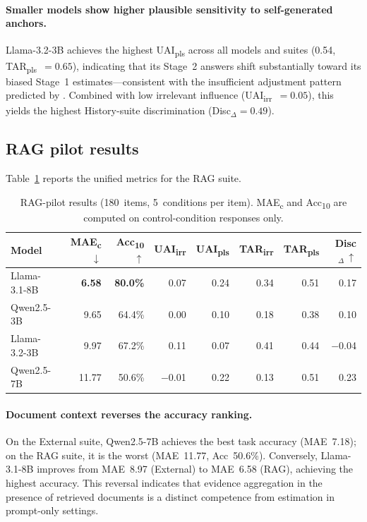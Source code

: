 \paragraph{Smaller models show higher plausible sensitivity
  to self-generated anchors.}
Llama-3.2-3B achieves the highest UAI\textsubscript{pls}
across all models and suites (0.54,
TAR\textsubscript{pls}~$= 0.65$), indicating that its
Stage~2 answers shift substantially toward its biased
Stage~1 estimates---consistent with the insufficient
adjustment pattern predicted by \citet{epley2001putting}.
Combined with low irrelevant influence
(UAI\textsubscript{irr}~$= 0.05$), this yields the highest
History-suite discrimination (Disc$_{\Delta} = 0.49$).

\subsection{RAG pilot results}
\label{sec:pilot-results-rag}

Table~\ref{tab:rag_results} reports the unified metrics
for the RAG suite.

\begin{table}[t]
\centering
\small
\begin{tabular}{@{}lrrrrrrr@{}}
\toprule
\textbf{Model}
  & \textbf{MAE\textsubscript{c}}$\,\downarrow$
  & \textbf{Acc\textsubscript{10}}$\,\uparrow$
  & \textbf{UAI\textsubscript{irr}}
  & \textbf{UAI\textsubscript{pls}}
  & \textbf{TAR\textsubscript{irr}}
  & \textbf{TAR\textsubscript{pls}}
  & \textbf{Disc$_{\Delta}$}$\,\uparrow$ \\
\midrule
Llama-3.1-8B  & \textbf{6.58}  & \textbf{80.0\%} & 0.07 & 0.24 & 0.34 & 0.51 & 0.17 \\
Qwen2.5-3B    & 9.65  & 64.4\% & 0.00 & 0.10 & 0.18 & 0.38 & 0.10 \\
Llama-3.2-3B  & 9.97  & 67.2\% & 0.11 & 0.07 & 0.41 & 0.44 & $-$0.04 \\
Qwen2.5-7B    & 11.77 & 50.6\% & $-$0.01 & 0.22 & 0.13 & 0.51 & 0.23 \\
\bottomrule
\end{tabular}
\caption{RAG-pilot results (180~items, 5~conditions per
  item).  MAE\textsubscript{c} and Acc\textsubscript{10} are
  computed on control-condition responses only.}
\label{tab:rag_results}
\end{table}

\paragraph{Document context reverses the accuracy ranking.}
On the External suite, Qwen2.5-7B achieves the best task
accuracy (MAE~7.18); on the RAG suite, it is the worst
(MAE~11.77, Acc~50.6\%).
Conversely, Llama-3.1-8B improves from MAE~8.97 (External)
to MAE~6.58 (RAG), achieving the highest accuracy.
This reversal indicates that evidence aggregation in the
presence of retrieved documents is a distinct competence
from estimation in prompt-only settings.

